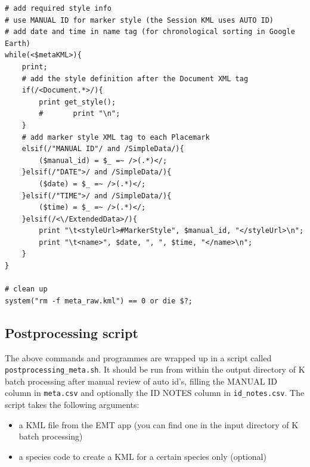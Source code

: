 \documentclass[English, 11pt, twoside, authoryear]{article}
\begin{document}
\begin{lstlisting}
# add required style info
# use MANUAL ID for marker style (the Session KML uses AUTO ID)
# add date and time in name tag (for chronological sorting in Google Earth)
while(<$metaKML>){
    print;
    # add the style definition after the Document XML tag
    if(/<Document.*>/){
        print get_style();
        #       print "\n";
    }
    # add marker style XML tag to each Placemark
    elsif(/"MANUAL ID"/ and /SimpleData/){
        ($manual_id) = $_ =~ />(.*)</;
    }elsif(/"DATE">/ and /SimpleData/){
        ($date) = $_ =~ />(.*)</;
    }elsif(/"TIME">/ and /SimpleData/){
        ($time) = $_ =~ />(.*)</;
    }elsif(/<\/ExtendedData>/){
        print "\t<styleUrl>#MarkerStyle", $manual_id, "</styleUrl>\n";
        print "\t<name>", $date, ", ", $time, "</name>\n";
    }
}

# clean up
system("rm -f meta_raw.kml") == 0 or die $?;
\end{lstlisting}

%
%
\subsection{Postprocessing script}
%
%

The above commands and programmes are wrapped up in a script called \texttt{postprocessing\_meta.sh}.
It should be run from within the output directory of \textsf{K} batch processing after manual review of auto id's, filling the MANUAL ID column in \texttt{meta.csv} and optionally the ID NOTES column in \texttt{id\_notes.csv}. The script takes the following arguments:
\begin{itemize}
\item a KML file from the EMT app (you can find one in the input directory of \textsf{K} batch processing)
\item a species code to create a KML for a certain species only (optional)
\end{itemize}
\end{document}
